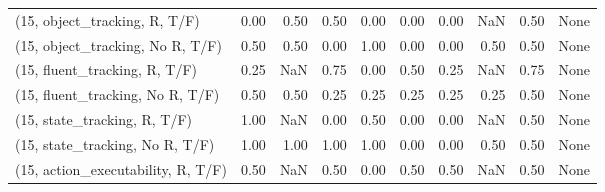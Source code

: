 \begin{table*}[h!]
\begin{adjustbox}{width=2\columnwidth,center}
\begin{tabular}{lrrr|rrr|rrr}
\midrule
(15, object\_tracking, R, T/F)         &                      0.00 &                  0.50 &                      0.50 &                          0.00 &                      0.00 &                          0.00 &                                    NaN &                               0.50 &                                  None \\
(15, object\_tracking, No R, T/F)      &                      0.50 &                  0.50 &                      0.00 &                          1.00 &                      0.00 &                          0.00 &                                   0.50 &                               0.50 &                                  None \\
(15, fluent\_tracking, R, T/F)         &                      0.25 &                   NaN &                      0.75 &                          0.00 &                      0.50 &                          0.25 &                                    NaN &                               0.75 &                                  None \\
(15, fluent\_tracking, No R, T/F)      &                      0.50 &                  0.50 &                      0.25 &                          0.25 &                      0.25 &                          0.25 &                                   0.25 &                               0.50 &                                  None \\
(15, state\_tracking, R, T/F)          &                      1.00 &                   NaN &                      0.00 &                          0.50 &                      0.00 &                          0.00 &                                    NaN &                               0.50 &                                  None \\
(15, state\_tracking, No R, T/F)       &                      1.00 &                  1.00 &                      1.00 &                          1.00 &                      0.00 &                          0.00 &                                   0.50 &                               0.50 &                                  None \\
(15, action\_executability, R, T/F)    &                      0.50 &                   NaN &                      0.50 &                          0.00 &                      0.50 &                          0.50 &                                    NaN &                               0.50 &                                  None \\

\end{tabular}
\end{adjustbox}
\end{table*}
